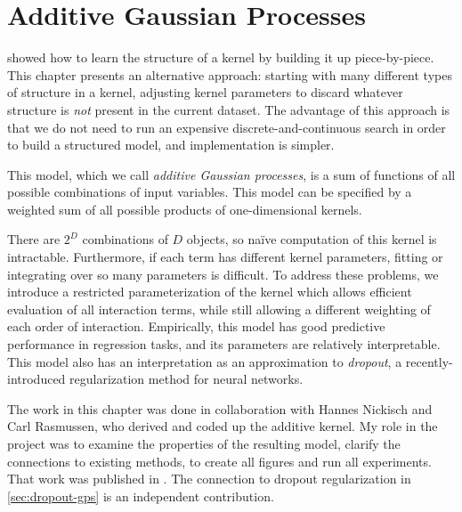 
\inbpdocument



\chapter{Additive Gaussian Processes}
\label{ch:additive}





 showed how to learn the structure of a kernel by building it up piece-by-piece.
This chapter presents an alternative approach: starting with many different types of structure in a kernel, adjusting kernel parameters to discard whatever structure is \emph{not} present in the current dataset.
The advantage of this approach is that we do not need to run an expensive discrete-and-continuous search in order to build a structured model, and implementation is simpler.

This model, which we call \emph{additive Gaussian processes}, is a sum of functions of all possible combinations of input variables.
This model can be specified by a weighted sum of all possible products of one-dimensional kernels.

There are $2^D$ combinations of $D$ objects, so na\"{i}ve computation of this kernel is intractable.
Furthermore, if each term has different kernel parameters, fitting or integrating over so many parameters is difficult.
To address these problems, we introduce a restricted parameterization of the kernel which allows efficient evaluation of all interaction terms, while still allowing a different weighting of each order of interaction.
Empirically, this model has good predictive performance in regression tasks, and its parameters are relatively interpretable.
This model also has an interpretation as an approximation to \emph{dropout}, a recently-introduced regularization method for neural networks.

The work in this chapter was done in collaboration with Hannes Nickisch and Carl Rasmussen, who derived and coded up the additive kernel.
My role in the project was to examine the properties of the resulting model, clarify the connections to existing methods, to create all figures and run all experiments.
That work was published in \citet{duvenaud2011additive11}.
The connection to dropout regularization in \cref{sec:dropout-gps} is an independent contribution.






